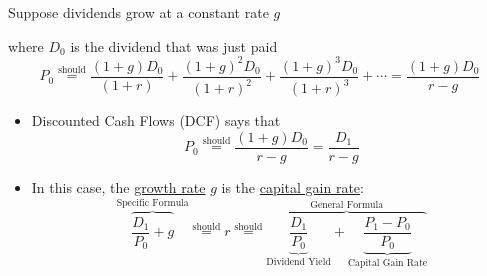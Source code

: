 \documentclass{beamer}
\newcommand{\should}{\overset{\text{should}}{=}}
\begin{document}
\begin{frame}{}
Suppose dividends grow at a constant rate $g$ 
\begin{figure}[H]
	\begin{center}
	\end{center}
\end{figure}
where $D_{0}$ is the dividend that was just paid
\begin{equation*}
	P_{0}\should\frac{(1+g)D_{0}}{(1+r)}+\frac{(1+g)^{2}D_{0}}{(1+r)^2}+\frac{(1+g)^{3}D_{0}}{(1+r)^3}+\cdots=\frac{(1+g)D_{0}}{r-g}
\end{equation*}
\end{frame}

\begin{frame}{}
\begin{itemize}
	\item Discounted Cash Flows (DCF) says that
	\begin{equation*}
		P_{0}\should\frac{(1+g)D_{0}}{r-g}=\frac{D_{1}}{r-g}
	\end{equation*}
	\item In this case, the \underline{growth rate} $g$ is the \underline{capital gain rate}:
	\begin{equation*}
		\overbrace{\frac{D_{1}}{P_{0}}+g}^{\text{Specific Formula}}\should r\should\overbrace{\underbrace{\frac{D_{1}}{P_{0}}}_{\text{Dividend Yield}}+\underbrace{\frac{P_{1}-P_{0}}{P_{0}}}_{\text{Capital Gain Rate}}}^{\text{General Formula}}
	\end{equation*}
\end{itemize}
\end{frame}
\end{document}
